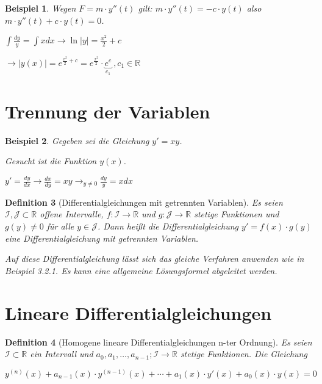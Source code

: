 \documentclass[fontset=ubuntu,11pt,a4paper,fleqn,headsepline]{scrreprt}
\newtheorem{defi}{Definition}[section]
\newtheorem{beispiel}[defi]{Beispiel}
\begin{document}
\begin{multicols}{2}
\begin{beispiel}
            Wegen \(F=m \cdot y''(t)\) gilt: \(m \cdot y''(t)=-c \cdot y(t)\) also \(m \cdot y''(t) + c \cdot y(t) = 0\).
    
            \(\int\frac{dy}{y}=\int xdx \to \ln\left|y\right| = \frac{x^2}{2}+c \)

            \(\to |y(x)| = e^{\frac{x^2}{2}+c}=e^{\frac{x^2}{2}}\cdot \underbrace{e^c}_{c_1}\ ,c_1\in\mathbb{R}\)
        \end{beispiel}
    
        \section*{Trennung der Variablen}
        \begin{beispiel}
            Gegeben sei die Gleichung \(y'=xy\).
    
            Gesucht ist die Funktion \(y(x)\).
    
            \(y'=\frac{dy}{dx} \to \frac{dx}{dy}=xy \to_{y \ne 0} \frac{dy}{y}=xdx\)
        \end{beispiel}
    
        \begin{defi}[Differentialgleichungen mit getrennten Variablen]
            Es seien \\ \(\mathcal{I},\mathcal{J}\subset\mathbb{R}\) offene Intervalle, \(f:\mathcal{I}\to\mathbb{R}\) und \(g:\mathcal{J}\to\mathbb{R}\) stetige Funktionen und \(g(y)\ne0\) für alle \(y\in\mathcal{J}\). Dann heißt die Differentialgleichung \(y'=f(x)\cdot g(y)\) eine Differentialgleichung mit getrennten Variablen.
    
            Auf diese Differentialgleichung lässt sich das gleiche Verfahren anwenden wie in Beispiel 3.2.1. Es kann eine allgemeine Lösungsformel abgeleitet werden.
        \end{defi}
        
        \section*{Lineare Differentialgleichungen}
        \begin{defi}[Homogene lineare Differentialgleichungen n-ter Ordnung]
            Es seien \(\mathcal{I} \subset \mathbb{R}\) ein Intervall und \(a_0,a_1,\dots,a_{n-1};\mathcal{I} \to \mathbb{R}\) stetige Funktionen. Die Gleichung

            \(y^{(n)}(x) + a_{n-1}(x) \cdot y^{(n-1)}(x) + \cdots + a_1(x) \cdot y'(x) + a_0(x) \cdot y(x) = 0 \)
            

\end{defi}
\end{multicols}
\end{document}
